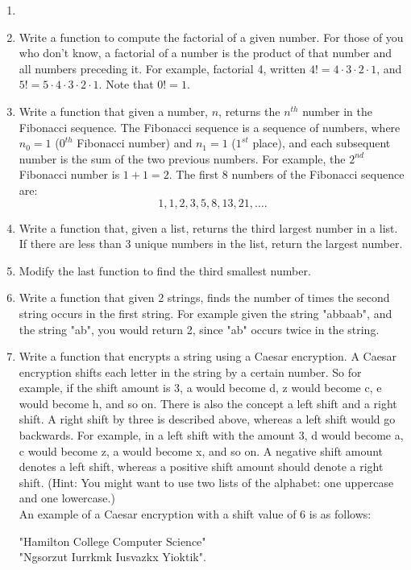 \documentclass[11pt, letterpaper, onecolumn, oneside, final]{article}
\begin{document}
\begin{enumerate}
    
    \item 


    \item Write a function to compute the factorial of a given number. For those of you who don't know, a factorial of a number is the product  of that number and all numbers preceding it. For example, factorial 4, written $4! = 4 \cdot 3 \cdot 2 \cdot 1$, and $5! = 5 \cdot 4 \cdot 3 \cdot 2 \cdot 1$. Note that $0! = 1$.
    \item Write a function that given a number, $n$, returns the $n^{th}$ number in the Fibonacci sequence. The Fibonacci sequence is a sequence of numbers, where $n_0 = 1$ ($0^{th}$ Fibonacci number) and $n_1 = 1$ ($1^{st}$ place), and each subsequent number is the sum of the two previous numbers. For example, the $2^{nd}$ Fibonacci number is $1 + 1 = 2$. The first 8 numbers of the Fibonacci sequence are:
    $$
    1, 1, 2, 3, 5, 8, 13, 21, \dots.
    $$
    \item Write a function that, given a list, returns the third largest number in a list. If there are less than 3 unique numbers in the list, return the largest number. 
    \item Modify the last function to find the third smallest number. 
    \item Write a function that given 2 strings, finds the number of times the second string occurs in the first string. For example given the string "abbaab", and the string "ab", you would return 2, since "ab" occurs twice in the string. 
    \item Write a function that encrypts a string using a Caesar encryption. A Caesar encryption shifts each letter in the string by a certain number. So for example, if the shift amount is 3, {\consolas a} would become d, z would become {\consolas c}, {\consolas e} would become {\consolas h}, and so on. There is also the concept a left shift and a right shift. A right shift by three is described above, whereas a left shift would go backwards. For example, in a left shift with the amount 3, {\consolas d} would become {\consolas a}, {\consolas c} would become {\consolas z}, {\consolas a} would become {\consolas x}, and so on. A negative shift amount denotes a left shift, whereas a positive shift amount should denote a right shift. (Hint: You might want to use two lists of the alphabet: one uppercase and one lowercase.) \\
    An example of a Caesar encryption with a shift value of 6 is as follows:
    \begin{center}
        {\consolas "Hamilton College Computer Science"}\\
        {\consolas "Ngsorzut Iurrkmk Iusvazkx Yioktik"}.
    \end{center}
    

\end{enumerate}
\end{document}
